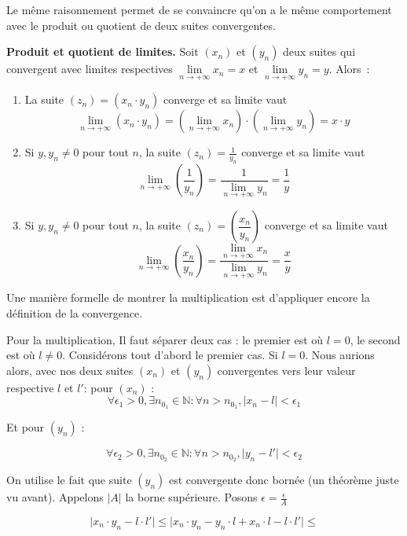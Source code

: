 Le même raisonnement permet de se convaincre qu'on a le même comportement avec le produit ou quotient de deux suites convergentes.
\begin{greybox}
\textbf{Produit et quotient de limites.} Soit $(x_n)$ et $(y_n)$ deux suites qui convergent avec limites respectives $\lim \limits_{n \to +\infty}x_n = x$ et $\lim \limits_{n \to +\infty}y_n = y$. Alors~:

\begin{enumerate}
    \item La suite $(z_n) = (x_n \cdot y_n)$ converge et sa limite vaut $$\lim \limits_{n \to +\infty}(x_n \cdot y_n) = \left(\lim \limits_{n \to +\infty} x_n\right) \cdot \left(\lim \limits_{n \to +\infty} y_n\right) = x \cdot y$$
    \item Si $y,y_n \neq 0$ pour tout $n$, la suite $(z_n) = \frac{1}{y_n}$ converge et sa limite vaut $$\lim \limits_{n \to +\infty}\left( \frac{1}{y_n} \right) = \frac{1}{\lim \limits_{n \to +\infty} y_n} = \frac{1}{y}$$ 
    \item Si $y,y_n \neq 0$ pour tout $n$, la suite $(z_n) = \left(\dfrac{x_n}{y_n}\right)$ converge et sa limite vaut $$\lim \limits_{n \to +\infty}\left( \frac{x_n}{y_n} \right) = \frac{\lim \limits_{n \to +\infty} x_n}{\lim \limits_{n \to +\infty} y_n} = \frac{x}{y}$$
\end{enumerate}
\end{greybox}
Une manière formelle de montrer la multiplication est d'appliquer encore la définition de la convergence. 


Pour la multiplication, Il faut séparer deux cas : le premier est où $l = 0$, le second est où $l \ne 0$. Considérons tout d'abord le premier cas. Si $l = 0$. Nous aurions alors, avec nos deux suites $(x_n)$ et $(y_n)$ convergentes vers leur valeur respective $l$ et $l'$: 
pour $(x_n)$ :
$$\forall \epsilon_1 > 0 , \exists n_{0_1} \in \mathbb{N} : \forall n > n_{0_1}, \lvert x_n - l \rvert < \epsilon_1$$

Et pour $(y_n)$ :

$$\forall \epsilon_2 > 0 , \exists n_{0_2} \in \mathbb{N} : \forall n > n_{0_2}, \lvert y_n - l' \rvert < \epsilon_2$$


On utilise le fait que suite $(y_n)$ est convergente donc bornée (un théorème juste vu avant). Appelons $\lvert A \rvert$  la borne supérieure. Posons $\epsilon = \frac{\epsilon}{A}$ 


$$\lvert x_n \cdot y_n - l \cdot l' \rvert \leq \lvert x_n \cdot y_n  - y_n \cdot l + x_n\cdot l- l \cdot l' \rvert \leq$$

